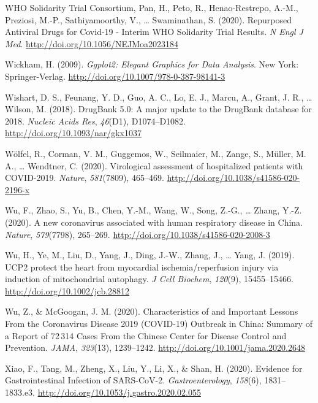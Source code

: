 \documentclass[12pt,twoside,openany,\mydriver]{thesis}  %
\begin{document}
\leavevmode\hypertarget{ref-who_solidarity_trial_consortium_repurposed_2020}{}%
WHO Solidarity Trial Consortium, Pan, H., Peto, R., Henao-Restrepo, A.-M., Preziosi, M.-P., Sathiyamoorthy, V., \ldots{} Swaminathan, S. (2020). Repurposed Antiviral Drugs for Covid-19 - Interim WHO Solidarity Trial Results. \emph{N Engl J Med}. \url{http://doi.org/10.1056/NEJMoa2023184}

\leavevmode\hypertarget{ref-wickham_ggplot2_2009}{}%
Wickham, H. (2009). \emph{Ggplot2: Elegant Graphics for Data Analysis}. New York: Springer-Verlag. \url{http://doi.org/10.1007/978-0-387-98141-3}

\leavevmode\hypertarget{ref-wishart_drugbank_2018}{}%
Wishart, D. S., Feunang, Y. D., Guo, A. C., Lo, E. J., Marcu, A., Grant, J. R., \ldots{} Wilson, M. (2018). DrugBank 5.0: A major update to the DrugBank database for 2018. \emph{Nucleic Acids Res}, \emph{46}(D1), D1074--D1082. \url{http://doi.org/10.1093/nar/gkx1037}

\leavevmode\hypertarget{ref-wolfel_virological_2020}{}%
Wölfel, R., Corman, V. M., Guggemos, W., Seilmaier, M., Zange, S., Müller, M. A., \ldots{} Wendtner, C. (2020). Virological assessment of hospitalized patients with COVID-2019. \emph{Nature}, \emph{581}(7809), 465--469. \url{http://doi.org/10.1038/s41586-020-2196-x}

\leavevmode\hypertarget{ref-wu_new_2020}{}%
Wu, F., Zhao, S., Yu, B., Chen, Y.-M., Wang, W., Song, Z.-G., \ldots{} Zhang, Y.-Z. (2020). A new coronavirus associated with human respiratory disease in China. \emph{Nature}, \emph{579}(7798), 265--269. \url{http://doi.org/10.1038/s41586-020-2008-3}

\leavevmode\hypertarget{ref-wu_ucp2_2019}{}%
Wu, H., Ye, M., Liu, D., Yang, J., Ding, J.-W., Zhang, J., \ldots{} Yang, J. (2019). UCP2 protect the heart from myocardial ischemia/reperfusion injury via induction of mitochondrial autophagy. \emph{J Cell Biochem}, \emph{120}(9), 15455--15466. \url{http://doi.org/10.1002/jcb.28812}

\leavevmode\hypertarget{ref-wu_characteristics_2020}{}%
Wu, Z., \& McGoogan, J. M. (2020). Characteristics of and Important Lessons From the Coronavirus Disease 2019 (COVID-19) Outbreak in China: Summary of a Report of 72\,314 Cases From the Chinese Center for Disease Control and Prevention. \emph{JAMA}, \emph{323}(13), 1239--1242. \url{http://doi.org/10.1001/jama.2020.2648}

\leavevmode\hypertarget{ref-xiao_evidence_2020}{}%
Xiao, F., Tang, M., Zheng, X., Liu, Y., Li, X., \& Shan, H. (2020). Evidence for Gastrointestinal Infection of SARS-CoV-2. \emph{Gastroenterology}, \emph{158}(6), 1831--1833.e3. \url{http://doi.org/10.1053/j.gastro.2020.02.055}
\end{document}
